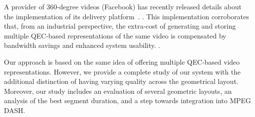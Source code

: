 A  provider of 360-degree videos (Facebook) has recently
released details about the implementation of its delivery
platform~\cite{facebook}.
. This implementation
corroborates that, from an industrial perspective, the extra-cost of
generating and storing multiple \ac{QEC}-based representations of the
same video is compensated by bandwidth savings and
enhanced system usability.
.

Our approach is based on the same
idea of offering multiple \ac{QEC}-based video representations.
However, we provide a complete study of our system with the additional
distinction of having varying quality across the geometrical layout. Moreover,
our study includes an evaluation of several
geometric layouts, an analysis of the best segment duration, 
and a step towards integration into MPEG \ac{DASH}.
